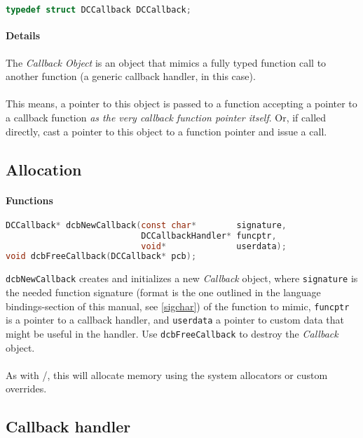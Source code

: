 \begin{lstlisting}[language=c]
typedef struct DCCallback DCCallback;
\end{lstlisting}

\paragraph{Details}
The \emph{Callback Object} is an object that mimics a fully typed function
call to another function (a generic callback handler, in this case).\\
\\
This means, a pointer to this object is passed to a function accepting a pointer
to a callback function \emph{as the very callback function pointer itself}.
Or, if called directly, cast a pointer to this object to a function pointer and
issue a call.


\subsection{Allocation}

\paragraph{Functions}

\begin{lstlisting}[language=c]
DCCallback* dcbNewCallback(const char*        signature,
                           DCCallbackHandler* funcptr,
                           void*              userdata);
void dcbFreeCallback(DCCallback* pcb);
\end{lstlisting}

\lstinline{dcbNewCallback} creates and initializes a new \emph{Callback} object,
where \lstinline{signature} is the needed function signature (format is the
one outlined in the language bindings-section of this manual, see \ref{sigchar})
of the function to mimic, \lstinline{funcptr} is a pointer to a callback handler,
and \lstinline{userdata} a pointer to custom data that might be useful in the
handler.
Use \lstinline{dcbFreeCallback} to destroy the \emph{Callback} object.\\
\\
As with /, this will allocate memory using the
system allocators or custom overrides.


\subsection{Callback handler}

